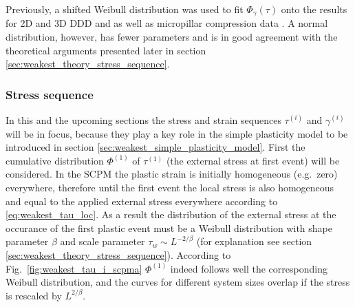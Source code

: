 Previously, a shifted Weibull distribution was used to fit ${\Phi _\gamma }\left( \tau  \right)$ onto the results for 2D and 3D DDD and as well as micropillar compression data \cite{ISPANOVITY20136234}. A normal distribution, however, has fewer parameters and is in good agreement with the theoretical arguments presented later in section \ref{sec:weakest_theory_stress_sequence}.

\subsubsection{Stress sequence}

In this and the upcoming sections the stress and strain sequences ${\tau ^{\left( i \right)}}$ and ${\gamma ^{\left( i \right)}}$ will be in focus, because they play a key role in the simple plasticity model to be introduced in section \ref{sec:weakest_simple_plasticity_model}. First the cumulative distribution ${\Phi ^{\left( 1 \right)}}$ of ${\tau ^{\left( 1 \right)}}$ (the external stress at first event) will be considered. In the SCPM the plastic strain is initially homogeneous (e.g.\ zero) everywhere, therefore until the first event the local stress is also homogeneous and equal to the applied external stress everywhere according to \cref{eq:weakest_tau_loc}. As a result the distribution of the external stress at the occurance of the first plastic event must be a Weibull distribution with shape parameter $\beta$ and scale parameter ${\tau _w} \sim {L^{ - 2/\beta }}$ (for explanation see section \ref{sec:weakest_theory_stress_sequence}). According to Fig.~\ref{fig:weakest_tau_i_scpma} ${\Phi ^{\left( 1 \right)}}$ indeed follows well the corresponding Weibull distribution, and the curves for different system sizes overlap if the stress is rescaled by ${L^{2/\beta }}$.

